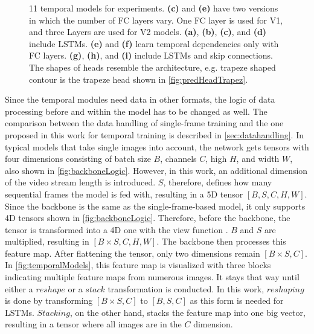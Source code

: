 \begin{figure}[H]
    \caption{11 temporal models for experiments. \textbf{(c)} and \textbf{(e)} have two versions in which the number of \ac{FC} layers vary. One \ac{FC} layer is used for V1, and three Layers are used for V2 models. \textbf{(a)}, \textbf{(b)}, \textbf{(c)}, and \textbf{(d)} include \ac{LSTM}s. \textbf{(e)} and \textbf{(f)} learn temporal dependencies only with \ac{FC} layers. \textbf{(g)}, \textbf{(h)}, and \textbf{(i)} include \ac{LSTM}s and skip connections. The shapes of heads resemble the architecture, e.g. trapeze shaped contour is the trapeze head shown in \autoref{fig:predHeadTrapez}.}
    \label{fig:temporalModels}
\end{figure}

\noindent Since the temporal modules need data in other formats, the logic of data processing before and within the model has to be changed as well.
The comparison between the data handling of single-frame training and the one proposed in this work for temporal training is described in \autoref{sec:datahandling}.
In typical models that take single images into account, the network gets tensors with four dimensions consisting of batch size $B$, channels $C$, high $H$, and width $W$, also shown in \autoref{fig:backboneLogic}.
However, in this work, an additional dimension of the video stream length is introduced.
$S$, therefore, defines how many sequential frames the model is fed with, resulting in a 5D tensor $[B, S, C, H, W]$.
Since the backbone is the same as the single-frame-based model, it only supports 4D tensors shown in \autoref{fig:backboneLogic}.
Therefore, before the backbone, the tensor is transformed into a 4D one with the view function \cite{pytorch_view_docu}.
$B$ and $S$ are multiplied, resulting in $[B \times S, C, H, W]$.
The backbone then processes this feature map.
After flattening the tensor, only two dimensions remain $[B \times S, C]$.
In \autoref{fig:temporalModels}, this feature map is visualized with three blocks indicating multiple feature maps from numerous images.
It stays that way until either a $reshape$ or a $stack$ transformation is conducted.
In this work, $reshaping$ is done by transforming $[B \times S, C]$ to $[B, S, C]$ as this form is needed for \ac{LSTM}s.
$Stacking$, on the other hand, stacks the feature map into one big vector, resulting in a tensor where all images are in the $C$ dimension. 

